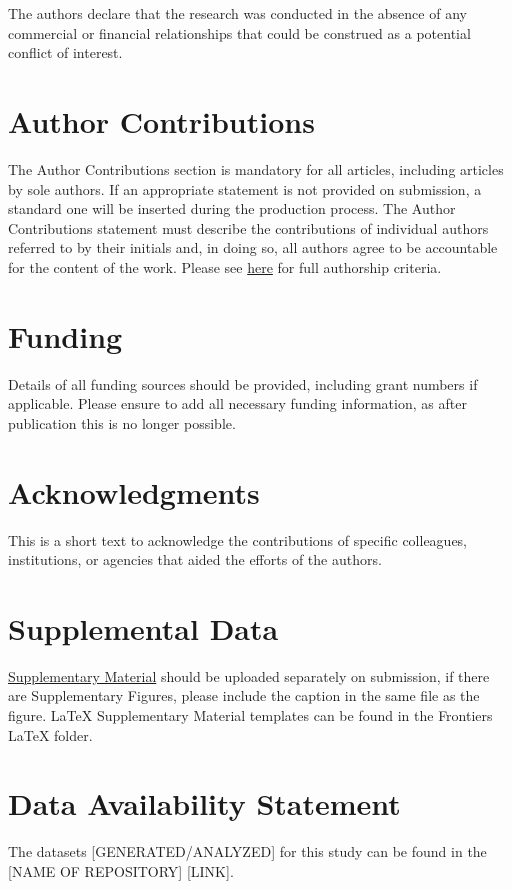 \documentclass[utf8]{FrontiersinHarvard} %
\begin{document}
The authors declare that the research was conducted in the absence of any commercial or financial relationships that could be construed as a potential conflict of interest.

\section*{Author Contributions}

The Author Contributions section is mandatory for all articles, including articles by sole authors. If an appropriate statement is not provided on submission, a standard one will be inserted during the production process. The Author Contributions statement must describe the contributions of individual authors referred to by their initials and, in doing so, all authors agree to be accountable for the content of the work. Please see  \href{https://www.frontiersin.org/guidelines/policies-and-publication-ethics#authorship-and-author-responsibilities}{here} for full authorship criteria.

\section*{Funding}
Details of all funding sources should be provided, including grant numbers if applicable. Please ensure to add all necessary funding information, as after publication this is no longer possible.

\section*{Acknowledgments}
This is a short text to acknowledge the contributions of specific colleagues, institutions, or agencies that aided the efforts of the authors.

\section*{Supplemental Data}
 \href{https://www.frontiersin.org/guidelines/author-guidelines#supplementary-material}{Supplementary Material} should be uploaded separately on submission, if there are Supplementary Figures, please include the caption in the same file as the figure. LaTeX Supplementary Material templates can be found in the Frontiers LaTeX folder.

\section*{Data Availability Statement}
The datasets [GENERATED/ANALYZED] for this study can be found in the [NAME OF REPOSITORY] [LINK].
\end{document}
